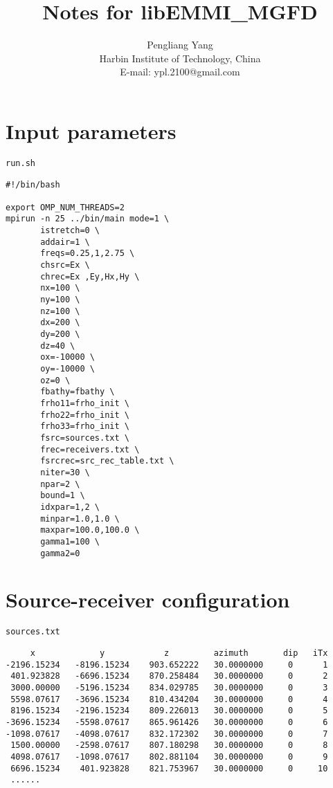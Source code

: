 \documentclass[a4paper,10pt]{article}
\title{Notes for libEMMI\_MGFD}
\author{Pengliang Yang\\
Harbin Institute of Technology, China\\
E-mail: ypl.2100@gmail.com}
\begin{document}
\maketitle


\section{Input parameters}
\verb|run.sh|
\begin{verbatim}
#!/bin/bash

export OMP_NUM_THREADS=2
mpirun -n 25 ../bin/main mode=1 \
       istretch=0 \
       addair=1 \
       freqs=0.25,1,2.75 \
       chsrc=Ex \
       chrec=Ex ,Ey,Hx,Hy \
       nx=100 \
       ny=100 \
       nz=100 \
       dx=200 \
       dy=200 \
       dz=40 \
       ox=-10000 \
       oy=-10000 \
       oz=0 \
       fbathy=fbathy \
       frho11=frho_init \
       frho22=frho_init \
       frho33=frho_init \
       fsrc=sources.txt \
       frec=receivers.txt \
       fsrcrec=src_rec_table.txt \
       niter=30 \
       npar=2 \
       bound=1 \
       idxpar=1,2 \
       minpar=1.0,1.0 \
       maxpar=100.0,100.0 \
       gamma1=100 \
       gamma2=0
\end{verbatim}

\section{Source-receiver configuration}

\verb|sources.txt|
\begin{verbatim}
     x             y            z         azimuth       dip   iTx
-2196.15234   -8196.15234    903.652222   30.0000000     0      1
 401.923828   -6696.15234    870.258484   30.0000000     0      2
 3000.00000   -5196.15234    834.029785   30.0000000     0      3
 5598.07617   -3696.15234    810.434204   30.0000000     0      4
 8196.15234   -2196.15234    809.226013   30.0000000     0      5
-3696.15234   -5598.07617    865.961426   30.0000000     0      6
-1098.07617   -4098.07617    832.172302   30.0000000     0      7
 1500.00000   -2598.07617    807.180298   30.0000000     0      8
 4098.07617   -1098.07617    802.881104   30.0000000     0      9
 6696.15234    401.923828    821.753967   30.0000000     0     10
 ......
\end{verbatim}
\end{document}
